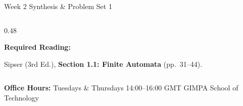 \documentclass[aspectratio=169, 10pt]{beamer}
\newcommand{\greentitle}[1]{{\noindent\footnotesize\bfseries\color{accentGreen}#1}\par\vspace{0.03cm}}
\begin{document}
\begin{frame}{Week 2 Synthesis \& Problem Set 1}
\begin{columns}[T]
\begin{column}{0.48\textwidth}
\begin{tcolorbox}[examplecard]
        \greentitle{Required Reading:}
        {\scriptsize Sipser (3rd Ed.), \textbf{Section 1.1: Finite Automata} (pp.~31--44).}
      \end{tcolorbox}
    \end{column}
  \end{columns}
  
  \vspace{0.08cm}
  \begin{tcolorbox}[spotlightcard]
    \centering
    {\scriptsize\textbf{Office Hours:} Tuesdays \& Thursdays 14:00--16:00 GMT \;\textbar\; GIMPA School of Technology}
  \end{tcolorbox}
\end{frame}
\end{document}
